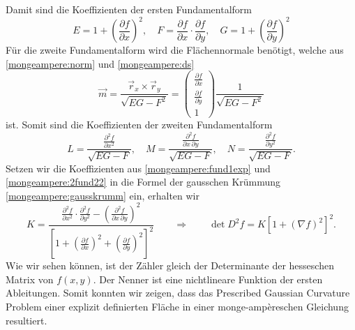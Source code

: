 Damit sind die Koeffizienten der ersten Fundamentalform 
\begin{equation}
  E = 1 + \left(\frac{\partial f}{\partial x}\right)^2, \quad
  F = \frac{\partial f}{\partial x} \cdot \frac{\partial f}{\partial y}, \quad
  G = 1 + \left(\frac{\partial f}{\partial y}\right)^2
  \label{mongeampere:fund1exp}
\end{equation}
Für die zweite Fundamentalform wird die Flächennormale benötigt, welche aus \eqref{mongeampere:norm} und \eqref{mongeampere:ds} 
\begin{equation}
  \vec m = \frac{\vec r_x \times \vec r_y}{\sqrt{EG-F^2}} = \begin{pmatrix}
    \frac{\partial f}{\partial x} \\
    \frac{\partial f}{\partial y} \\
    1
  \end{pmatrix}
  \frac{1}{\sqrt{EG-F^2}}
  \label{mongeampere:norm2}
\end{equation}
ist.
Somit sind die Koeffizienten der zweiten Fundamentalform
\begin{equation}
  L = \frac{\displaystyle\frac{\partial^2 f}{\partial x^2}}{\sqrt{EG-F}}, \quad
  M = \frac{\displaystyle\frac{\partial^2 f}{\partial x \, \partial y}}{\sqrt{EG-F}}, \quad
  N = \frac{\displaystyle\frac{\partial^2 f}{\partial y^2}}{\sqrt{EG-F}}.
  \label{mongeampere:2fund22}
\end{equation}
Setzen wir die Koeffizienten aus \eqref{mongeampere:fund1exp} und \eqref{mongeampere:2fund22} in die Formel der gausschen Krümmung \eqref{mongeampere:gausskrumm}
ein, erhalten wir
\begin{equation}
  K = \frac{
    \displaystyle\frac{\partial^2 f}{\partial x^2} \cdot \displaystyle\frac{\partial^2 f}{\partial y^2} - \left(\displaystyle\frac{\partial^2 f}{\partial x \, \partial y} \right)^2}
    {\left[1 + 
    \left(\displaystyle\frac{\partial f}{\partial x}\right)^2 +
    \left(\displaystyle\frac{\partial f}{\partial y}\right)^2\right]^2}
\qquad\Rightarrow\qquad
    \det D^2 f = K \left[ 1 + 
    \left(\nabla f\right)^2\right]^2.
    \label{mongeampere:pd}
\end{equation}
Wie wir sehen können, ist der Zähler gleich der Determinante der hesseschen Matrix von $f(x,y)$.
Der Nenner ist eine nichtlineare Funktion der ersten Ableitungen.
Somit konnten wir zeigen, dass das Prescribed Gaussian Curvature Problem einer explizit definierten Fläche in einer 
monge-ampèreschen Gleichung resultiert.

